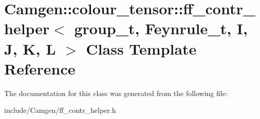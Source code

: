 \hypertarget{a00224}{\section{Camgen\-:\-:colour\-\_\-tensor\-:\-:ff\-\_\-contr\-\_\-helper$<$ group\-\_\-t, Feynrule\-\_\-t, I, J, K, L $>$ Class Template Reference}
\label{a00224}
}


The documentation for this class was generated from the following file\-:\begin{DoxyCompactItemize}
\item 
include/\-Camgen/ff\-\_\-contr\-\_\-helper.\-h\end{DoxyCompactItemize}
